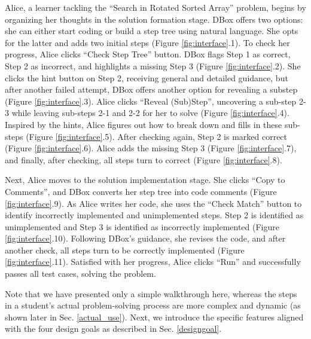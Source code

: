 Alice, a learner tackling the ``Search in Rotated Sorted Array'' problem, begins by organizing her thoughts in the solution formation stage. DBox offers two options: she can either start coding or build a step tree using natural language. She opts for the latter and adds two initial steps (Figure \ref{fig:interface}.1). To check her progress, Alice clicks ``Check Step Tree'' button. DBox flags Step 1 as correct, Step 2 as incorrect, and highlights a missing Step 3 (Figure \ref{fig:interface}.2). She clicks the hint button on Step 2, receiving general and detailed guidance, but after another failed attempt, DBox offers another option for revealing a substep (Figure \ref{fig:interface}.3). Alice clicks ``Reveal (Sub)Step'', uncovering a sub-step 2-3 while leaving sub-steps 2-1 and 2-2 for her to solve (Figure \ref{fig:interface}.4). Inspired by the hints, Alice figures out how to break down and fills in these sub-steps (Figure \ref{fig:interface}.5). After checking again, Step 2 is marked correct (Figure \ref{fig:interface}.6). Alice adds the missing Step 3 (Figure \ref{fig:interface}.7), and finally, after checking, all steps turn to correct (Figure \ref{fig:interface}.8).

Next, Alice moves to the solution implementation stage. She clicks ``Copy to Comments'', and DBox converts her step tree into code comments (Figure \ref{fig:interface}.9). As Alice writes her code, she uses the ``Check Match'' button to identify incorrectly implemented and unimplemented steps. Step 2 is identified as unimplemented and Step 3 is identified as incorrectly implemented (Figure \ref{fig:interface}.10). Following DBox's guidance, she revises the code, and after another check, all steps turn to be correctly implemented (Figure \ref{fig:interface}.11). Satisfied with her progress, Alice clicks ``Run'' and successfully passes all test cases, solving the problem.

Note that we have presented only a simple walkthrough here, whereas the steps in a student's actual problem-solving process are more complex and dynamic (as shown later in Sec. \ref{actual_use}). Next, we introduce the specific features aligned with the four design goals as described in Sec. \ref{designgoal}.




